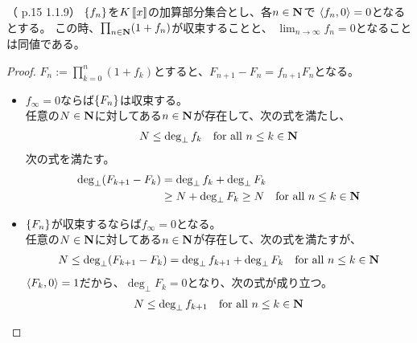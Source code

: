 {	\begin{proposition}[形式級数の収束その二]\label{prop:形式級数の収束その二} %
		（\cite{stanley-1} p.15 1.1.9）
		$\mathinner{\left\{{f_n}\right\}}$を$K\mathinner{[\![{x}]\!]}$の加算部分集合とし、各$n\in\mathbf{N}$で
		$\mathinner{\langle{f_n,0}\rangle}=0$となるとする。
		この時、$\prod_{n\in\mathbf{N}}(1 + f_n)$が収束することと、
		$\lim_{n\to\infty}f_n=0$となることは同値である。\EOP
	\end{proposition} %
	\begin{proof} %
		$F_n:=\prod_{k=0}^n(1 + f_k)$とすると、$F_{n+1}-F_n=f_{n+1}F_n$となる。
		\begin{itemize}\setlength{\itemsep}{-1mm} %
			\item $f_\infty=0$ならば$\mathinner{\left\{{F_n}\right\}}$は収束する。\\
			任意の$N\in\mathbf{N}$に対してある$n\in\mathbf{N}$が存在して、次の式を満たし、
			\begin{equation*}\begin{split}
				N\le \deg_\bot f_k \quad\text{for all } n\le k\in\mathbf{N}
			\end{split}\end{equation*}
			次の式を満たす。
			\begin{equation*}\begin{split}
				\deg_\bot(F_{k+1}-F_k) &= \deg_\bot f_k + \deg_\bot F_k \\
				&\ge N + \deg_\bot F_k\ge N \quad\text{for all } n\le k\in\mathbf{N}
			\end{split}\end{equation*}
			\item $\mathinner{\left\{{F_n}\right\}}$が収束するならば$f_\infty=0$となる。\\
			任意の$N\in\mathbf{N}$に対してある$n\in\mathbf{N}$が存在して、次の式を満たすが、
			\begin{equation*}\begin{split}
				N\le \deg_\bot(F_{k+1} - F_k)
				= \deg_\bot f_{k+1} + \deg_\bot F_k
				\quad\text{for all } n\le k\in\mathbf{N}
			\end{split}\end{equation*}
			$\mathinner{\langle{F_k,0}\rangle}=1$だから、$\deg_\bot F_k=0$となり、次の式が成り立つ。
			\begin{equation*}\begin{split}
				N\le\deg_\bot f_{k+1} \quad\text{for all } n\le k\in\mathbf{N}
			\end{split}\end{equation*}
		\end{itemize} %
	\end{proof} %

}
